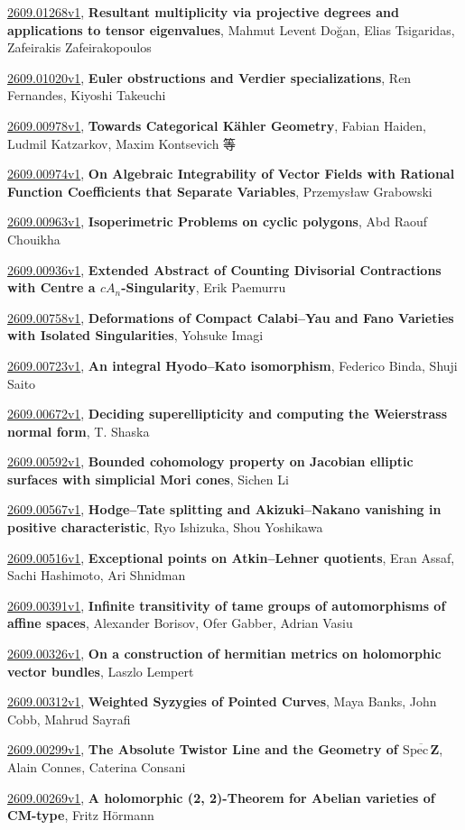 \documentclass[9pt, a4paper]{article}
\theoremstyle{plain}
\theoremstyle{definition}
\theoremstyle{remark}
\newcommand{\arxiv}[3]{\href{https://arxiv.org/abs/#1}{#1}, \textbf{\textcolor{arxivblue}{#2}}, #3}
\begin{document}
\arxiv{2609.01268v1}{Resultant multiplicity via projective degrees and applications to tensor eigenvalues}{Mahmut Levent Doğan, Elias Tsigaridas, Zafeirakis Zafeirakopoulos}

\arxiv{2609.01020v1}{Euler obstructions and Verdier specializations}{Ren Fernandes, Kiyoshi Takeuchi}

\arxiv{2609.00978v1}{Towards Categorical Kähler Geometry}{Fabian Haiden, Ludmil Katzarkov, Maxim Kontsevich 等}

\arxiv{2609.00974v1}{On Algebraic Integrability of Vector Fields with Rational Function Coefficients that Separate Variables}{Przemysław Grabowski}

\arxiv{2609.00963v1}{Isoperimetric Problems on cyclic polygons}{Abd Raouf Chouikha}

\arxiv{2609.00936v1}{Extended Abstract of Counting Divisorial Contractions with Centre a $cA_n$-Singularity}{Erik Paemurru}

\arxiv{2609.00758v1}{Deformations of Compact Calabi--Yau and Fano Varieties with Isolated Singularities}{Yohsuke Imagi}

\arxiv{2609.00723v1}{An integral Hyodo--Kato isomorphism}{Federico Binda, Shuji Saito}

\arxiv{2609.00672v1}{Deciding superellipticity and computing the Weierstrass normal form}{T. Shaska}

\arxiv{2609.00592v1}{Bounded cohomology property on Jacobian elliptic surfaces with simplicial Mori cones}{Sichen Li}

\arxiv{2609.00567v1}{Hodge--Tate splitting and Akizuki--Nakano vanishing in positive characteristic}{Ryo Ishizuka, Shou Yoshikawa}

\arxiv{2609.00516v1}{Exceptional points on Atkin--Lehner quotients}{Eran Assaf, Sachi Hashimoto, Ari Shnidman}

\arxiv{2609.00391v1}{Infinite transitivity of tame groups of automorphisms of affine spaces}{Alexander Borisov, Ofer Gabber, Adrian Vasiu}

\arxiv{2609.00326v1}{On a construction of hermitian metrics on holomorphic vector bundles}{Laszlo Lempert}

\arxiv{2609.00312v1}{Weighted Syzygies of Pointed Curves}{Maya Banks, John Cobb, Mahrud Sayrafi}

\arxiv{2609.00299v1}{The Absolute Twistor Line and the Geometry of $\overline{\text{Spec}\, \mathbf Z}$}{Alain Connes, Caterina Consani}

\arxiv{2609.00269v1}{A holomorphic (2, 2)-Theorem for Abelian varieties of CM-type}{Fritz Hörmann}
\end{document}

